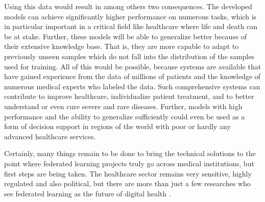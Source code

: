 Using this data would result in among others two consequences.
The developed models can achieve significantly higher performance on numerous tasks, which is in particular important in a critical field like healthcare where life and death can be at stake.
Further, these models will be able to generalize better because of their extensive knowledge base. That is, they are more capable to adapt to previously unseen samples which do not fall into the distribution of the samples used for training. 
All of this would be possible, because systems are available that have gained experience from the data of millions of patients and the knowledge of numerous medical experts who labeled the data.
Such comprehensive systems can contribute to improve healthcare, individualize patient treatment, and to better understand or even cure severe and rare diseases.
Further, models with high performance and the ability to generalize sufficiently could even be used as a form of decision support in regions of the world with poor or hardly any advanced healthcare services.

Certainly, many things remain to be done to bring the technical solutions to the point where federated learning projects truly go across medical institutions, but first steps are being taken. The healthcare sector remains very sensitive, highly regulated and also political, but there are more than just a few researches who see federated learning as the future of digital health \citep{Rieke2020TheLearning}.



